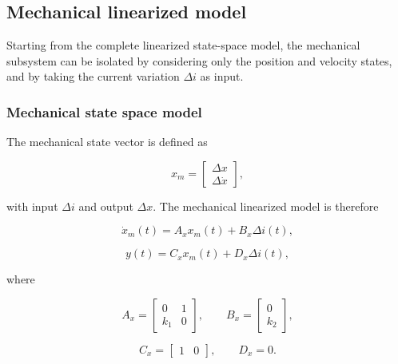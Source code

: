 \subsection{Mechanical linearized model}

Starting from the complete linearized state-space model, the mechanical subsystem can be isolated by considering only the position and velocity states, and by taking the current variation $\Delta i$ as input.

\subsubsection{Mechanical state space model}

The mechanical state vector is defined as

\begin{equation}
    x_m =
    \begin{bmatrix}
        \Delta x \\
        \Delta \dot{x}
    \end{bmatrix},
\end{equation}

with input $\Delta i$ and output $\Delta x$. The mechanical linearized model is therefore

\begin{equation}
    \dot{x}_m(t) = A_x x_m(t) + B_x \Delta i(t),
\end{equation}

\begin{equation}
    y(t) = C_x x_m(t) + D_x \Delta i(t),
\end{equation}

where

\begin{equation}
    A_x =
    \begin{bmatrix}
        0 & 1 \\
        k_1 & 0
    \end{bmatrix},
    \qquad
    B_x =
    \begin{bmatrix}
        0 \\
        k_2
    \end{bmatrix},
\end{equation}

\begin{equation}
    C_x =
    \begin{bmatrix}
        1 & 0
    \end{bmatrix},
    \qquad
    D_x = 0.
\end{equation}



